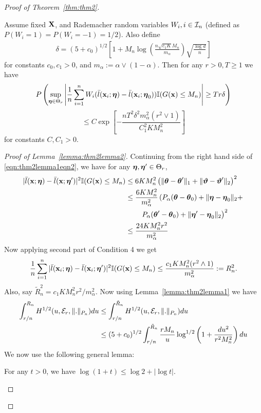 \documentclass[11pt,letterpaper]{article}
\numberwithin{equation}{section}
\begin{document}
\begin{proof}[Proof of Theorem~\ref{thm:thm2}]
\begin{Lemma}\label{lemma:thm2lemma2}
Assume fixed ${\mathbf{X}}$, and Rademacher random variables $W_i, i \in {\cal{I}}_n$ (defined as $P(W_i = 1) = P(W_i = -1) = 1/2$). Also define
%
\begin{align}\label{eqn:defineDelta}
\delta = ( 5 + c_0 )^{1/2} \left[ 1 + M_n 
\log \left( \frac{n \sqrt{c_1 K} M_n}{m_\alpha} \right) \sqrt{ \frac{ \log d}{n}} \right]
\end{align}
%
for constants $c_0, c_1 > 0$, and $m_\alpha := \alpha \vee (1-\alpha)$. Then for any $r>0, T \geq 1$ we have
%
$$
P \left( \sup_{{\boldsymbol{\eta}} \in \Theta_r} \left| \frac{1}{n} \sum_{i=1}^n W_i (\bar l({\bf{x}}_i; {\boldsymbol{\eta}}) -  \bar l( {\bf{x}}_i; {\boldsymbol{\eta}}_0)) {\mathbb{I}}(G({\bf{x}}) \leq M_n ) \right| \geq T r \delta \right) $$
$$ \leq C \exp \left[ - \frac{n T^2 \delta^2 m_\alpha^2 ( r^2 \vee 1)}{ C_1^2 K M_n^2} \right]
$$
%
for constants $C, C_1 > 0$.
\end{Lemma}

\begin{proof}[Proof of Lemma~\ref{lemma:thm2lemma2}]
Continuing from the right hand side of \eqref{eqn:thm2lemma1eqn2}, we have for any ${\boldsymbol{\eta}}, {\boldsymbol{\eta}}' \in \Theta_r$,
%
\begin{align*}
| \bar l({\bf{x}}; {\boldsymbol{\eta}}) -  \bar l( {\bf{x}}; {\boldsymbol{\eta}}')|^2 {\mathbb{I}}(G({\bf{x}}) \leq M_n ) & \leq
6K M_n^2 \left( \| {\boldsymbol{\theta}} - {\boldsymbol{\theta}}'\|_1 + \| {\boldsymbol{\vartheta}} - {\boldsymbol{\vartheta}}' \|_2 \right)^2\\
& \leq \frac{6 K M_n^2}{m_\alpha^2}
\left( P_\alpha( {\boldsymbol{\theta}} - {\boldsymbol{\theta}}_0) + \| {\boldsymbol{\eta}} - {\boldsymbol{\eta}}_0 \|_2 + \right.\\
& \qquad \left. P_\alpha( {\boldsymbol{\theta}}' - {\boldsymbol{\theta}}_0) + \| {\boldsymbol{\eta}}' - {\boldsymbol{\eta}}_0 \|_2 \right)^2\\
& \leq \frac{24 K M_n^2 r^2}{m_\alpha^2}
\end{align*}
%
Now applying second part of Condition 4 we get
%
\begin{align}\label{eqn:thm2lemma2eqn1}
\frac{1}{n} \sum_{i=1}^n | \bar l({\bf{x}}_i; {\boldsymbol{\eta}}) -  \bar l( {\bf{x}}_i; {\boldsymbol{\eta}}')|^2 {\mathbb{I}}(G({\bf{x}}) \leq M_n ) \leq
\frac{c_1 K M_n^2 ( r^2 \wedge 1)}{m_\alpha^2} := R_n^2.
\end{align}
%
Also, say $\tilde R_n^2 = c_1 K M_n^2 r^2 /m_\alpha^2$. Now using Lemma~\ref{lemma:thm2lemma1} we have
%
\begin{align}
\int_{r/n}^{R_n} H^{1/2} (u, {\cal{E}}_r, \|.\|_{P_n}) du & \leq
\int_{r/n}^{\tilde R_n} H^{1/2} (u, {\cal{E}}_r, \|.\|_{P_n}) du \notag\\
& \leq ( 5 + c_0 )^{1/2}  \int_{r/n}^{\tilde R_n}
\frac{ r M_n }{u} \log^{1/2} \left( 1 + \frac{ d u^2}{r^2 M_n^2} \right) du \label{eqn:thm2lemma2eqn2}
\end{align}
%
We now use the following general lemma:
%
\begin{Lemma}\label{lemma:thm2lemma3}
For any $t > 0$, we have $\log(1+t) \leq \log 2 + |\log t|$.
\end{Lemma}


\end{proof}
\end{proof}
\end{document}
